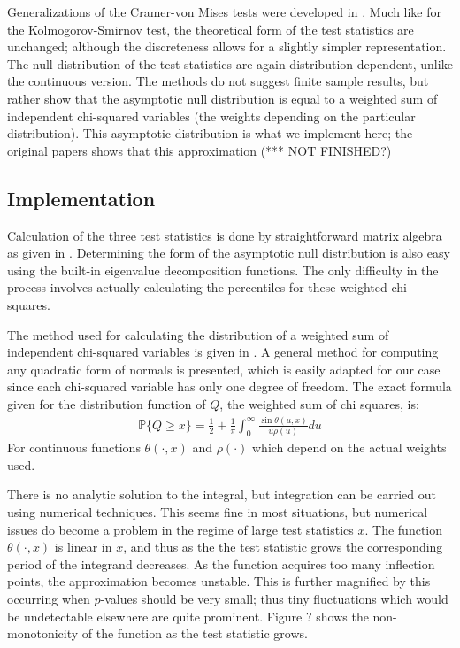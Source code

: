 \documentclass[article]{jss}
\begin{document}
Generalizations of the Cramer-von Mises tests were developed in \cite{choulakian1994}. Much like for the Kolmogorov-Smirnov test,
the theoretical form of the test statistics are unchanged; although the discreteness allows for a slightly simpler representation.
The null distribution of the test statistics are again distribution dependent, unlike the continuous version. The methods do not
suggest finite sample results, but rather show that the asymptotic null distribution is equal to a weighted sum of independent
chi-squared variables (the weights depending on the particular distribution). This asymptotic distribution is what we implement here;
the original papers shows that this approximation (*** NOT FINISHED?)



\subsection{Implementation}

Calculation of the three test statistics is done by straightforward matrix algebra as given in \cite{choulakian1994}. Determining 
the form of the asymptotic null distribution is also easy using the built-in eigenvalue decomposition functions. The only 
difficulty in the process involves actually calculating the percentiles for these weighted chi-squares. 

The method used for calculating the distribution of a weighted sum of independent chi-squared variables is given in \cite{imhof1961}.
A general method for computing any quadratic form of normals is presented, which is easily adapted for our case since
each chi-squared variable has only one degree of freedom. The exact formula given for the distribution function of $Q$, the weighted
sum of chi squares, is:
\begin{align*}
\mathbb{P}\{Q \geq x \} = \frac{1}{2} + \frac{1}{\pi} \int_{0}^{\infty} \frac{\sin\theta(u,x)}{u \rho(u) } du
\end{align*}
For continuous functions $\theta(\cdot, x)$ and $\rho(\cdot)$ which depend on the actual weights used. 

There is no analytic solution to the integral, but integration can be carried out using numerical techniques. This seems
fine in most situations, but numerical issues do become a problem in the regime of large test statistics $x$. The function
$\theta(\cdot, x)$ is linear in $x$, and thus as the the test statistic grows the corresponding period of the integrand 
decreases. As the function acquires too many inflection points, the approximation becomes unstable. This is further
magnified by this occurring when $p$-values should be very small; thus tiny fluctuations which would be undetectable
elsewhere are quite prominent. Figure ? shows the non-monotonicity of the function as the test statistic grows.
\end{document}
